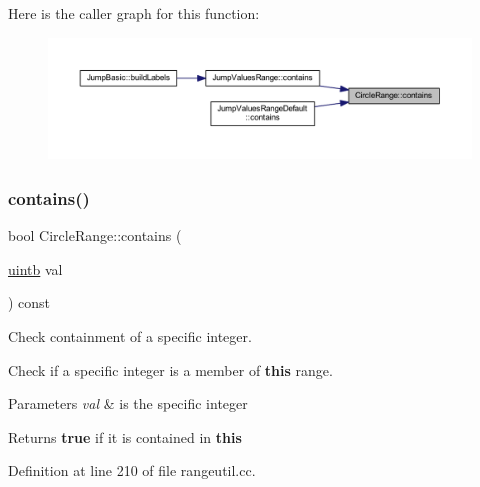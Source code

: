 Here is the caller graph for this function\+:
\nopagebreak
\begin{figure}[H]
\begin{center}
\leavevmode
\includegraphics[width=350pt]{class_circle_range_a9973f2c914dcfe8760079aaa0459d758_icgraph}
\end{center}
\end{figure}
\mbox{\label{class_circle_range_a4681b55d158417a6598dd09c08850848}} 
\subsubsection{\texorpdfstring{contains()}{contains()}\hspace{0.1cm}{\footnotesize\ttfamily [2/2]}}
{\footnotesize\ttfamily bool Circle\+Range\+::contains (\begin{DoxyParamCaption}\item[{\mbox{\hyperlink{types_8h_a2db313c5d32a12b01d26ac9b3bca178f}{uintb}}}]{val }\end{DoxyParamCaption}) const}



Check containment of a specific integer. 

Check if a specific integer is a member of {\bfseries{this}} range. 
\begin{DoxyParams}{Parameters}
{\em val} & is the specific integer \\
\hline
\end{DoxyParams}
\begin{DoxyReturn}{Returns}
{\bfseries{true}} if it is contained in {\bfseries{this}} 
\end{DoxyReturn}


Definition at line 210 of file rangeutil.\+cc.

\mbox{\label{class_circle_range_a57c77df53b7ce6f316044d14b6446028}} 
